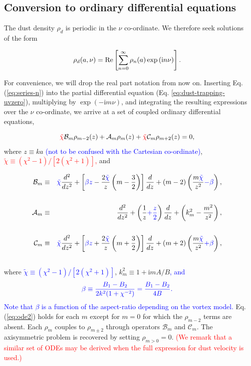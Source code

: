 \documentclass[apj]{emulateapj}
\def\blue#1{\textcolor{blue}{#1}}
\def\red#1{\textcolor{red}{#1}}
\newcommand{\Eq}[1]{Eq. (\ref{#1})}
\newcommand{\eq}[1]{\Eq{#1}}
\newcommand{\eqp}[1]{(Eq. \ref{#1})}
\newcommand{\beq}{\begin{equation}}
\newcommand{\eeq}{\end{equation}}
\newcommand{\beqn}{\begin{eqnarray}}
\newcommand{\eeqn}{\end{eqnarray}}
\newcommand{\tilchi}{\tilde\chi}
\begin{document}
\subsection{Conversion to ordinary differential equations}

The dust density $\rho_d$ is periodic in the $\nu$ co-ordinate. We 
therefore seek solutions of the form

\beq\label{eq:series-n}
\rho_d(a,\nu) = {\rm Re}
\left[\sum_{n=0}^\infty\rho_n(a)\exp{\left(\mathrm{i}n\nu\right)} \right].
\eeq

For convenience, we will drop the real part notation from now on. Inserting
\eq{eq:series-n} into the partial differential equation \eqp{eq:dust-trapping-uvzero},
multiplying by $\exp{(-\mathrm{i}m\nu)}$, and integrating the resulting
expressions over the $\nu$ co-ordinate, we arrive at a set of coupled
ordinary differential equations, 

\blue{
\beq\label{eq:ode2}
\red{\tilchi}\mathcal{B}_m\rho_{m-2} (z)+ \mathcal{A}_m\rho_m(z) + \red{\tilchi}\mathcal{C}_m\rho_{m+2}(z) = 0,
\eeq
}
where $z\equiv ka$ \blue{(not to be confused with the Cartesian co-ordinate)}, \red{$\tilchi\equiv(\chi^2-1)/[2(\chi^2+1)]$,} and

\beqn
\mathcal{B}_m &\equiv& \blue{\tilchi}\frac{d^2}{dz^2} + \left[\blue{\beta z}-
  \frac{2\blue{\tilchi}}{z}
  \left(m-\frac{3}{2}\right)\right]\frac{d}{dz}+\left(m-2\right)\left(\frac{m\blue{\tilchi}}{z^2}\blue{-\beta}\right), \notag\\
&&\label{eq:ops}\\ 
\mathcal{A}_m&\equiv&\frac{d^2}{dz^2} +\left(\frac{1}{z}\blue{+\frac{z}{2}}\right)\frac{d}{dz} +\left(k_m^2-\frac{m^2}{z^2}\right),\\
%
&&\notag\\
\mathcal{C}_m &\equiv& \blue{\tilchi}\frac{d^2}{dz^2}
+\left[\blue{\beta z} +
  \frac{2\blue{\tilchi}}{z}\left(m+\frac{3}{2}\right)\right]\frac{d}{dz}
+ \left(m+2\right)\left(\frac{m\blue{\tilchi}}{z^2}
  \blue{+\beta}\right),\notag\\
&&\label{eq:opsw}
\eeqn
where \blue{$\tilchi\equiv(\chi^2-1)/[2(\chi^2+1)]$}, $k_m^2 \equiv 1+\mathrm{i}mA/B$\blue{, and}
\beq
\blue{\beta \equiv \frac{B_1-B_2}{2k^2(1+\chi^{-2})} = \frac{B_1 - B_2}{4B}.}
\eeq
\blue{Note that $\beta$ is a function of the aspect-ratio depending on the vortex model.} 
\eq{eq:ode2} holds for each $m$ except for $m=0$ for which the $\rho_{m-2}$ terms are absent. Each 
$\rho_m$ couples to $\rho_{m\pm2}$ through operators $\mathcal{B}_m$
and $\mathcal{C}_m$. The axisymmetric problem is recovered by
setting $\rho_{m>0}=0$. \red{(We remark that a similar set of ODEs may be derived when the full expression for dust velocity is used.)}
\end{document}
